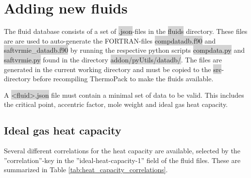\documentclass[english]{../thermomemo/thermomemo}
\newcommand{\code}[1]{\colorbox{lightgray}{#1}} %
\begin{document}
\section{Adding new fluids}
The fluid database consists of a set of \code{.json}-files in the \code{fluids} directory. These files are are used to auto-generate the FORTRAN-files \code{compdatadb.f90} and \code{saftvrmie\_datadb.f90} by running the respective python scripts \code{compdata.py} and \code{saftvrmie.py} found in the directory \code{addon/pyUtils/datadb/}. The files are generated in the current working directory and must be copied to the \code{src}-directory before recompiling ThermoPack to make the fluids available. 

A \code{<fluid>.json} file must contain a minimal set of data to be valid. This includes the critical point, accentric factor, mole weight and ideal gas heat capacity. 

\subsection{Ideal gas heat capacity}
Several different correlations for the heat capacity are available, selected by the ''correlation''-key in the ''ideal-heat-capacity-1'' field of the fluid files. These are summarized in Table \ref{tab:heat_capacity_correlations}.
\end{document}
